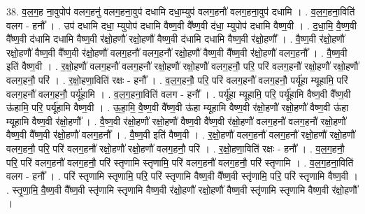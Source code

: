 \documentclass[17pt]{extarticle}
\begin{document}
38. व॒ल॒ग॒ह ना॒वुपोप॑ वलग॒हनु॑ वलग॒हना॒वुप॑ दधामि दधा॒म्युप॑ वलग॒हनौ॑ वलग॒हना॒वुप॑ दधामि । . व॒ल॒ग॒हना॒विति॑ वलग - हनौ᳚ । . उप॑ दधामि दधा॒ म्युपोप॑ दधामि वैष्ण॒वी वै᳚ष्ण॒वी द॑धा॒ म्युपोप॑ दधामि वैष्ण॒वी । . द॒धा॒मि॒ वै॒ष्ण॒वी वै᳚ष्ण॒वी द॑धामि दधामि वैष्ण॒वी र॑क्षो॒हणौ॑ रक्षो॒हणौ॑ वैष्ण॒वी द॑धामि दधामि वैष्ण॒वी र॑क्षो॒हणौ᳚ । . वै॒ष्ण॒वी र॑क्षो॒हणौ॑ रक्षो॒हणौ॑ वैष्ण॒वी वै᳚ष्ण॒वी र॑क्षो॒हणौ॑ वलग॒हनौ॑ वलग॒हनौ॑ रक्षो॒हणौ॑ वैष्ण॒वी वै᳚ष्ण॒वी र॑क्षो॒हणौ॑ वलग॒हनौ᳚ । . वै॒ष्ण॒वी इति॑ वैष्ण॒वी । . र॒क्षो॒हणौ॑ वलग॒हनौ॑ वलग॒हनौ॑ रक्षो॒हणौ॑ रक्षो॒हणौ॑ वलग॒हनौ॒ परि॒ परि॑ वलग॒हनौ॑ रक्षो॒हणौ॑ रक्षो॒हणौ॑ वलग॒हनौ॒ परि॑ । . र॒क्षो॒हणा॒विति॑ रक्षः - हनौ᳚ । . व॒ल॒ग॒हनौ॒ परि॒ परि॑ वलग॒हनौ॑ वलग॒हनौ॒ पर्यू॑हा म्यूहामि॒ परि॑ वलग॒हनौ॑ वलग॒हनौ॒ पर्यू॑हामि । . व॒ल॒ग॒हना॒विति॑ वलग - हनौ᳚ । . पर्यू॑हा म्यूहामि॒ परि॒ पर्यू॑हामि वैष्ण॒वी वै᳚ष्ण॒वी ऊ॑हामि॒ परि॒ पर्यू॑हामि वैष्ण॒वी । . ऊ॒हा॒मि॒ वै॒ष्ण॒वी वै᳚ष्ण॒वी ऊ॑हा म्यूहामि वैष्ण॒वी र॑क्षो॒हणौ॑ रक्षो॒हणौ॑ वैष्ण॒वी ऊ॑हा म्यूहामि वैष्ण॒वी र॑क्षो॒हणौ᳚ । . वै॒ष्ण॒वी र॑क्षो॒हणौ॑ रक्षो॒हणौ॑ वैष्ण॒वी वै᳚ष्ण॒वी र॑क्षो॒हणौ॑ वलग॒हनौ॑ वलग॒हनौ॑ रक्षो॒हणौ॑ वैष्ण॒वी वै᳚ष्ण॒वी र॑क्षो॒हणौ॑ वलग॒हनौ᳚ । . वै॒ष्ण॒वी इति॑ वैष्ण॒वी । . र॒क्षो॒हणौ॑ वलग॒हनौ॑ वलग॒हनौ॑ रक्षो॒हणौ॑ रक्षो॒हणौ॑ वलग॒हनौ॒ परि॒ परि॑ वलग॒हनौ॑ रक्षो॒हणौ॑ रक्षो॒हणौ॑ वलग॒हनौ॒ परि॑ । . र॒क्षो॒हणा॒विति॑ रक्षः - हनौ᳚ । . व॒ल॒ग॒हनौ॒ परि॒ परि॑ वलग॒हनौ॑ वलग॒हनौ॒ परि॑ स्तृणामि स्तृणामि॒ परि॑ वलग॒हनौ॑ वलग॒हनौ॒ परि॑ स्तृणामि । . व॒ल॒ग॒हना॒विति॑ वलग - हनौ᳚ । . परि॑ स्तृणामि स्तृणामि॒ परि॒ परि॑ स्तृणामि वैष्ण॒वी वै᳚ष्ण॒वी स्तृ॑णामि॒ परि॒ परि॑ स्तृणामि वैष्ण॒वी । . स्तृ॒णा॒मि॒ वै॒ष्ण॒वी वै᳚ष्ण॒वी स्तृ॑णामि स्तृणामि वैष्ण॒वी र॑क्षो॒हणौ॑ रक्षो॒हणौ॑ वैष्ण॒वी स्तृ॑णामि स्तृणामि वैष्ण॒वी र॑क्षो॒हणौ᳚ । \newline
\end{document}

